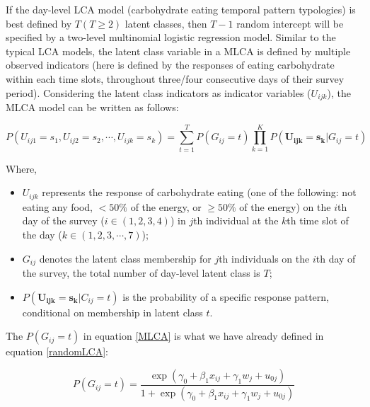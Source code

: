 If the day-level LCA model (carbohydrate eating temporal pattern typologies) is best defined by $T (T \geqslant 2)$ latent classes, then $T-1$ random intercept will be specified by a two-level multinomial logistic regression model. Similar to the typical LCA models, the latent class variable in a MLCA is defined by multiple observed indicators (here is defined by the responses of eating carbohydrate within each time slots, throughout three/four consecutive days of their survey period). Considering the latent class indicators as indicator variables ($U_{ijk}$), the MLCA model can be written as follows:\vspace{-1cm}

\begin{equation}
P(U_{ij1} = s_1, U_{ij2} = s_2, \cdots, U_{ijk} = s_{k}) = \sum_{t=1}^{T}P(G_{ij}=t)\prod_{k=1}^{K}P(\mathbf{U_{ijk} = s_k} | G_{ij} = t)
\label{MLCA}
\end{equation}
\vspace{-0.8cm}


Where, 

\begin{itemize}
	\item $ U_{ijk} $ represents the response of carbohydrate eating (one of the following: not eating any food, $< 50\%$ of the energy, or $\geqslant 50\%$ of the energy) on the $i$th day of the survey ($i \in (1,2,3,4)$) in $j$th individual at the $k$th time slot of the day ($k \in (1, 2, 3, \cdots, 7)$);
	\item $G_{ij}$ denotes the latent class membership for $j$th individuals on the $i$th day of the survey, the total number of day-level latent class is $T$;
	\item $P(\mathbf{U_{ijk} = s_k}|C_{ij} = t)$ is the probability of a specific response pattern, conditional on membership in latent class $t$.
\end{itemize}


The $P(G_{ij} = t)$ in equation \ref{MLCA} is what we have already defined in equation \ref{randomLCA}: \vspace{-0.3cm} 

\begin{equation}
P(G_{ij} = t) = \frac{\exp{(\gamma_0 + \beta_{1}x_{ij} + \gamma_1 w_j + u_{0j})}}{1 + \exp{(\gamma_0 + \beta_{1}x_{ij} + \gamma_1 w_j + u_{0j})}} 
\end{equation}

